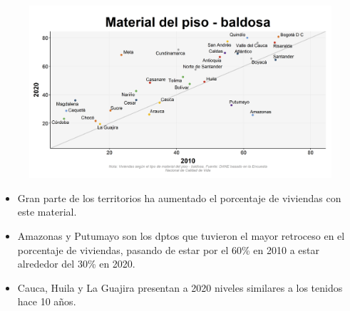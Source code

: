     \begin{figure}[H]
        \caption[Viviendas con piso de baldosa por departamentos - 2010 VS 2020 ]{\label{piso_baldosa_dptos_vs} }
        \begin{center}
        \includegraphics[width=\textwidth,keepaspectratio]{img/var_173_scatter_time.png}
        \end{center}
    \end{figure}
            \begin{itemize}
                    \item Gran parte de los territorios ha aumentado el porcentaje de viviendas con este material.
                    \item Amazonas y Putumayo son los dptos que tuvieron el mayor retroceso en el porcentaje de viviendas, pasando de estar por el 60\% en 2010 a estar alrededor del 30\% en 2020.
                    \item Cauca, Huila y La Guajira presentan a 2020 niveles similares a los tenidos hace 10 años.
                    \end{itemize}

